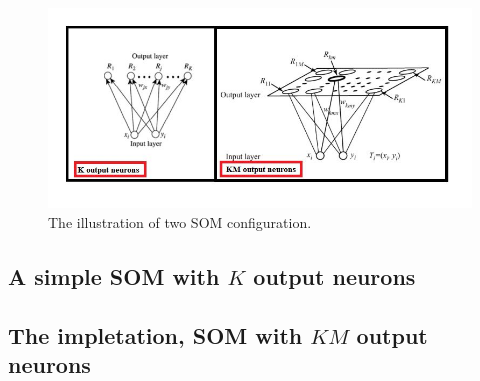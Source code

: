 \begin{figure}[h]
  \centering
  \includegraphics[width=15cm]{Pictures/SimonAmin2Methods.JPG}
  \caption{The illustration of two SOM configuration\cite{zhu2006neural,zhu2006k}.}
\end{figure}

\subsection{A simple SOM with $K$ output neurons}
\subsection{The impletation, SOM with $KM$ output neurons}